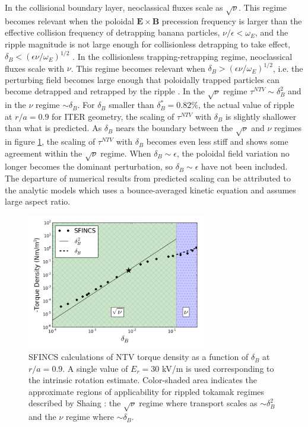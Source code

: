 \documentclass{article}
\begin{document}
In the collisional boundary layer, neoclassical fluxes scale as $\sqrt{\nu}$. This regime becomes relevant when the poloidal $\bm{E} \times \bm{B}$ precession frequency is larger than the effective collision frequency of detrapping banana particles, $\nu/\epsilon < \omega_E$, and the ripple magnitude is not large enough for collisionless detrapping to take effect, $\delta_B < \left(  \epsilon \nu/\omega_E \right)^{1/2}$ \cite{Shaing2008}. 
In the collisionless trapping-retrapping regime, neoclassical fluxes scale with $\nu$. This regime becomes relevant when $\delta_B > \left(  \epsilon \nu/\omega_E \right)^{1/2}$, i.e. the perturbing field becomes large enough that poloidally trapped particles can become detrapped and retrapped by the ripple \cite{Shaing2010}. In the $\sqrt{\nu}$ regime $\tau^{NTV} \sim \delta_B^2$ and in the $\nu$ regime $\sim \delta_B$. For $\delta_B$ smaller than $\delta_B^* = 0.82\%$, the actual value of ripple at $r/a=0.9$ for ITER geometry, the scaling of $\tau^{NTV}$ with $\delta_B$ is slightly shallower than what is predicted. 
As $\delta_B$ nears the boundary between the $\sqrt{\nu}$ and $\nu$ regimes in figure \ref{fig:scalescan}, the scaling of $\tau^{NTV}$ with $\delta_B$ becomes even less stiff and shows some agreement within the $\sqrt{\nu}$ regime. When $\delta_B \sim \epsilon$, the poloidal field variation no longer becomes the dominant perturbation, so $\delta_B \sim \epsilon$ have not been included. The departure of numerical results from predicted scaling can be attributed to the analytic models which uses a bounce-averaged kinetic equation and assumes large aspect ratio. 

\begin{figure}[h!]
\centering
\includegraphics[width=0.7\textwidth]
{scalescan.png}
\caption{\label{fig:scalescan} SFINCS calculations of NTV torque density as a function of $\delta_B$ at $r/a = 0.9$. A single value of $E_r = 30$ kV/m is used corresponding to the intrinsic rotation estimate. Color-shaded area indicates the approximate regions of applicability for rippled tokamak regimes described by Shaing \cite{Shaing2010, Shaing2008}: the $\sqrt{\nu}$ regime where transport scales as $\sim \delta_B^2$ and the $\nu$ regime where $\sim \delta_B$. }
\end{figure} 
\end{document}
